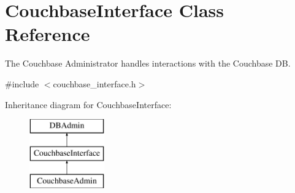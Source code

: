 \hypertarget{classCouchbaseInterface}{\section{Couchbase\-Interface Class Reference}
\label{classCouchbaseInterface}
}


The Couchbase Administrator handles interactions with the Couchbase D\-B.  




{\ttfamily \#include $<$couchbase\-\_\-interface.\-h$>$}

Inheritance diagram for Couchbase\-Interface\-:\begin{figure}[H]
\begin{center}
\leavevmode
\includegraphics[height=3.000000cm]{classCouchbaseInterface}
\end{center}
\end{figure}
